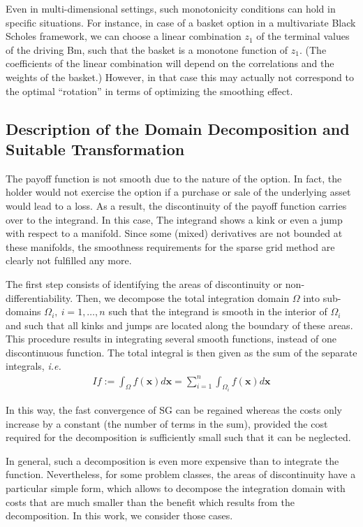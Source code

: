 \documentclass[11pt]{article}
\newcommand{\ie}{\emph{i.e.}}
\begin{document}
Even in multi-dimensional settings, such monotonicity conditions can hold in specific situations. For instance, in case of a basket option in a multivariate Black Scholes framework, we can choose a linear combination $z_1$ of the terminal values of the driving Bm, such that the basket is a monotone function of $z_1$. (The coefficients of the linear combination will depend on the correlations and the weights of the basket.) However, in that case this may actually not correspond to the optimal ``rotation'' in terms of optimizing the smoothing effect.

\subsection{Description of the Domain Decomposition and Suitable Transformation}\label{sec:Description of the Domain Decomposition and Suitable Transformation}
The payoff function is not smooth due to
the nature of the option. In fact, the holder would not exercise
the option if a purchase or sale of the underlying asset would lead to a loss. As a result, the discontinuity of the payoff function carries over to the integrand. In this case, The integrand shows a kink  or even a jump with respect to a  manifold. Since some
(mixed) derivatives are not bounded at these manifolds, the smoothness requirements for the sparse grid method are clearly not fulfilled any more.

The first step consists of identifying the areas 
of discontinuity or non-differentiability. Then, we decompose the total integration domain $\Omega$ into sub-domains $\Omega_i,\: i=1,\dots,n$ such that the
integrand is smooth in the interior of 
$\Omega_i$ and such that all kinks and jumps are
located along the boundary of these areas.  This procedure results in integrating several smooth functions, instead of one discontinuous function. The total integral is then given
as the sum of the separate integrals, \ie
\begin{align}
	I f := \int_{\Omega} f(\mathbf{x}) d \mathbf{x}=\sum_{i=1}^{n}	\int_{\Omega_i} f(\mathbf{x}) d \mathbf{x}
\end{align}

In this way, the fast convergence of SG can
be regained whereas the costs only increase by a constant (the number of terms in
the sum), provided the cost required for the decomposition is sufficiently small such that it can be neglected.




In general, such a decomposition is even more expensive than to integrate the function. Nevertheless, for some problem classes, the areas of discontinuity have a particular simple form, which allows to decompose the integration domain with
costs that are much smaller than the benefit which results from the decomposition.  In this work, we consider those cases.
\end{document}
